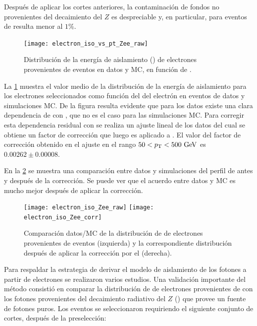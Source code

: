 Después de aplicar los cortes anteriores, la contaminación de fondos no
provenientes del decaimiento del $Z$ es despreciable y, en particular, para eventos
de {\ttbar} resulta menor al $1\%$.

\begin{figure}[!htb]
  \centering

  \texttt{[image: electron\_iso\_vs\_pt\_Zee\_raw]}

  \caption{Distribución de la energía de aislamiento ({\etiso}) de electrones provenientes
    de eventos {\Zee} en datos y MC, en función de {\pt}.}
  \label{fig:isolation_vs_pt}
\end{figure}

La \cref{fig:isolation_vs_pt} muestra el valor medio de la distribución de la energía de
aislamiento para los electrones seleccionados como función del {\pt} del
electrón en eventos de datos y simulaciones MC. De la figura resulta evidente que
para los datos existe una clara dependencia de {\etiso} con {\pt}, que no es el caso
para las simulaciones MC.
Para corregir esta dependencia residual con {\pt} se realiza un ajuste lineal de los
datos del cual se obtiene un factor de corrección que luego es aplicado a {\etiso}.
El valor del factor de corrección
obtenido en el ajuste en el rango $50<\pt<500 \gev$ es $0.00262 \pm 0.00008$.

En la \cref{fig:isolation_wandwo_correction} se muestra una comparación entre
datos y simulaciones del perfil de {\etiso} antes y después de la corrección. Se
puede ver que el acuerdo entre datos y MC es mucho mejor después de aplicar la
corrección.


\begin{figure}[!htb]
  \centering

  \texttt{[image: electron\_iso\_Zee\_raw]}
  \texttt{[image: electron\_iso\_Zee\_corr]}

  \caption{Comparación datos/MC de la distribución de {\etiso} de electrones
    provenientes de eventos {\Zee} (izquierda) y la correspondiente distribución
    después de aplicar la corrección por el {\pt} (derecha).}
  \label{fig:isolation_wandwo_correction}
\end{figure}

Para respaldar la estrategia de derivar el modelo de aislamiento de los fotones
a partir de electrones se realizaron varios estudios. Una validación importante
del método consistió en comparar la distribución de {\etiso} de electrones
provenientes de {\Zee} con los fotones provenientes del decaimiento radiativo
del $Z$ (\Zee\gam) que provee un fuente de fotones puros. Los eventos se
seleccionaron requiriendo el siguiente conjunto de cortes, después de la
preselección:

